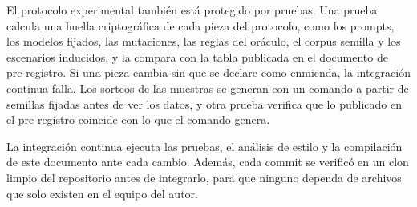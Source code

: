 \par
El protocolo experimental también está protegido por pruebas. Una prueba calcula una huella criptográfica de cada pieza del protocolo, como los prompts, los modelos fijados, las mutaciones, las reglas del oráculo, el corpus semilla y los escenarios inducidos, y la compara con la tabla publicada en el documento de pre-registro. Si una pieza cambia sin que se declare como enmienda, la integración continua falla. Los sorteos de las muestras se generan con un comando a partir de semillas fijadas antes de ver los datos, y otra prueba verifica que lo publicado en el pre-registro coincide con lo que el comando genera.
\par
La integración continua ejecuta las pruebas, el análisis de estilo y la compilación de este documento ante cada cambio. Además, cada commit se verificó en un clon limpio del repositorio antes de integrarlo, para que ninguno dependa de archivos que solo existen en el equipo del autor.
\par

